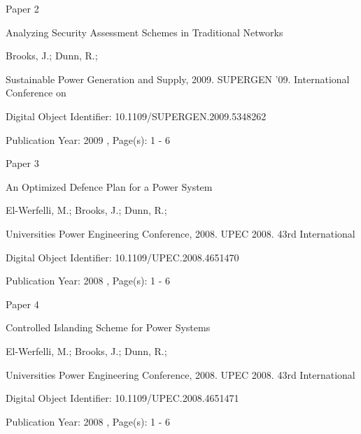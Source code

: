 \documentclass[a4paper,oneside,12pt]{report}
\begin{document}
\begin{center}\begin{large}
{\Huge Paper 2}
\vspace{40px}

Analyzing Security Assessment Schemes in Traditional Networks
\vspace{40px}

Brooks, J.; Dunn, R.;
\vspace{40px}

Sustainable Power Generation and Supply, 2009. SUPERGEN '09. International Conference on
\vspace{60px}

Digital Object Identifier: 10.1109/SUPERGEN.2009.5348262

Publication Year: 2009 , Page(s): 1 - 6
\end{large}\end{center}




\begin{center}\begin{large}
{\Huge Paper 3}
\vspace{40px}

An Optimized Defence Plan for a Power System
\vspace{40px}

El-Werfelli, M.; Brooks, J.; Dunn, R.;
\vspace{40px}

Universities Power Engineering Conference, 2008. UPEC 2008. 43rd International
\vspace{40px}

Digital Object Identifier: 10.1109/UPEC.2008.4651470

Publication Year: 2008 , Page(s): 1 - 6
\end{large}\end{center}




\begin{center}\begin{large}
{\Huge Paper 4}
\vspace{40px}

Controlled Islanding Scheme for Power Systems
\vspace{40px}

El-Werfelli, M.; Brooks, J.; Dunn, R.;
\vspace{40px}

Universities Power Engineering Conference, 2008. UPEC 2008. 43rd International
\vspace{40px}

Digital Object Identifier: 10.1109/UPEC.2008.4651471

Publication Year: 2008 , Page(s): 1 - 6
\end{large}\end{center}
\end{document}
